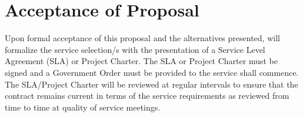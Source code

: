 \section{Acceptance of Proposal}
Upon formal acceptance of this proposal and the alternatives presented, \client will formalize the service selection/s with the presentation of a Service Level Agreement (SLA) or Project Charter. The SLA or Project Charter must be signed and a Government Order must be provided to \vendor the service shall commence. The SLA/Project Charter will be reviewed at regular intervals to ensure that the contract remains current in terms of the service requirements as reviewed from time to time at quality of service meetings.
